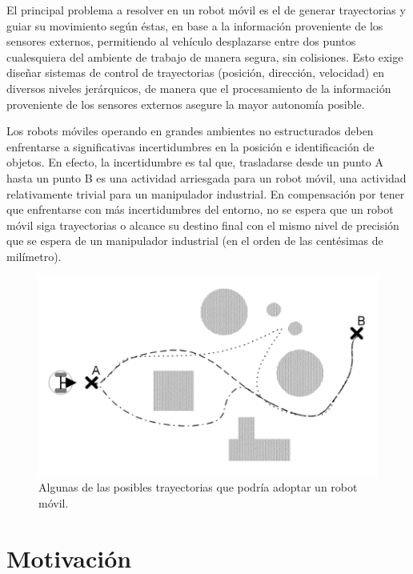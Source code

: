 El principal problema a resolver en un robot móvil es el de generar trayectorias y guiar su movimiento según éstas, en base a la información proveniente de los sensores externos, permitiendo al vehículo desplazarse entre dos puntos cualesquiera del ambiente de trabajo de manera segura, sin colisiones. Esto exige diseñar sistemas de control de trayectorias (posición, dirección, velocidad) en diversos niveles jerárquicos, de manera que el procesamiento de la información proveniente de los sensores externos asegure la mayor autonomía posible.

Los robots móviles operando en grandes ambientes no estructurados deben enfrentarse a significativas incertidumbres en la posición e identificación de objetos. En efecto, la incertidumbre es tal que, trasladarse desde un punto A hasta un punto B es una actividad arriesgada para un robot móvil, una actividad relativamente trivial para un manipulador industrial. En compensación por tener que enfrentarse con más incertidumbres del entorno, no se espera que un robot móvil siga trayectorias o alcance su destino final con el mismo nivel de precisión que se espera de un manipulador industrial (en el orden de las centésimas de milímetro).

\begin{figure}[ht]
	\centering
	\includegraphics[scale=.5]{./Figures/trayectorias_posibles.png}
	\caption{Algunas de las posibles trayectorias que podría adoptar un robot móvil.}
	\label{fig:trayectoriasPosibles}
\end{figure}


\section{Motivación}

